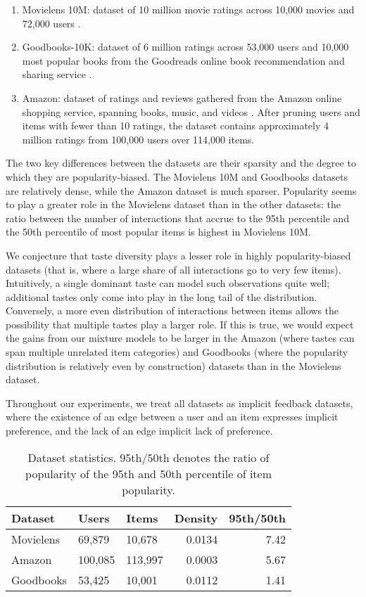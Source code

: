 \documentclass[sigconf]{acmart}
\begin{document}
\begin{enumerate}
\item Movielens 10M: dataset of 10 million movie ratings across 10,000 movies and 72,000 users \citep{harper2016movielens}.
\item Goodbooks-10K: dataset of 6 million ratings across 53,000 users and 10,000 most popular books from the Goodreads online book recommendation and sharing service \citep{goodbooks2017}.
\item Amazon: dataset of ratings and reviews gathered from the Amazon online shopping service, spanning books, music, and videos \citep{leskovec2007dynamics}. After pruning users and items with fewer than 10 ratings, the dataset contains approximately 4 million ratings from 100,000 users over 114,000 items.
\end{enumerate}
The two key differences between the datasets are their sparsity and the degree to which they are popularity-biased. The Movielens 10M and Goodbooks datasets are relatively dense, while the Amazon dataset is much sparser. Popularity seems to play a greater role in the Movielens dataset than in the other datasets: the ratio between the number of interactions that accrue to the 95th percentile and the 50th percentile of most popular items is highest in Movielens 10M.

We conjecture that taste diversity plays a lesser role in highly popularity-biased datasets (that is, where a large share of all interactions go to very few items). Intuitively, a single dominant taste can model such observations quite well; additional tastes only come into play in the long tail of the distribution. Conversely, a more even distribution of interactions between items allows the possibility that multiple tastes play a larger role. If this is true, we would expect the gains from our mixture models to be larger in the Amazon (where tastes can span multiple unrelated item categories) and Goodbooks (where the popularity distribution is relatively even by construction) datasets than in the Movielens dataset.

Throughout our experiments, we treat all datasets as implicit feedback datasets, where the existence of an edge between a user and an item expresses implicit preference, and the lack of an edge implicit lack of preference.

\begin{table}
  \caption{Dataset statistics. 95th/50th denotes the ratio of popularity of the 95th and 50th percentile of item popularity.}
  \label{tab:datasets}
\begin{tabularx}{\columnwidth}{lllrr}
\toprule
 Dataset       & Users   & Items   &   Density &   95th/50th \\
\midrule
 Movielens & 69,879  & 10,678  &    0.0134 &      7.42 \\
 Amazon        & 100,085 & 113,997 &    0.0003 &      5.67 \\
 Goodbooks     & 53,425  & 10,001  &    0.0112 &      1.41 \\
\bottomrule
\end{tabularx}
\end{table}
\end{document}
